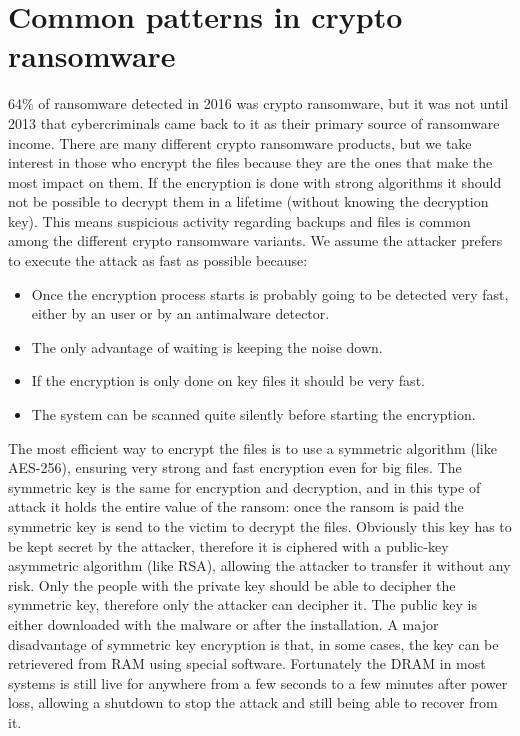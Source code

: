 \section{Common patterns in crypto ransomware}
64\% of ransomware detected in 2016 was crypto ransomware\cite{ransomware_digital_extortion}, but it was not until 2013 that cybercriminals came back to it as their primary source of ransomware income\cite{ransomware_oReilly}.
There are many different crypto ransomware products, but we take interest in those who encrypt the files because they are the ones that make the most impact on them.
If the encryption is done with strong algorithms it should not be possible to decrypt them in a lifetime (without knowing the decryption key).
\linej
\linej
This means suspicious activity regarding backups and files is common among the different crypto ransomware variants.
We assume the attacker prefers to execute the attack as fast as possible because:
\begin{itemize}
\item Once the encryption process starts is probably going to be detected very fast, either by an user or by an antimalware detector.
\item The only advantage of waiting is keeping the noise down.
\item If the encryption is only done on key files it should be very fast.
\item The system can be scanned quite silently before starting the encryption.
\end{itemize}
\linej
The most efficient way to encrypt the files is to use a symmetric algorithm (like AES-256), ensuring very strong and fast encryption even for big files.
The symmetric key is the same for encryption and decryption, and in this type of attack it holds the entire value of the ransom: once the ransom is paid the symmetric key is send to the victim to decrypt the files.
\linej
Obviously this key has to be kept secret by the attacker, therefore it is ciphered with a public-key asymmetric algorithm (like RSA), allowing the attacker to transfer it without any risk.
Only the people with the private key should be able to decipher the symmetric key, therefore only the attacker can decipher it.
The public key is either downloaded with the malware or after the installation.
\linej
A major disadvantage of symmetric key encryption is that, in some cases, the key can be retrievered from RAM using special software.
Fortunately the DRAM in most systems is still live for anywhere from a few seconds to a few minutes after power loss, allowing a shutdown to stop the attack and still being able to recover from it.
